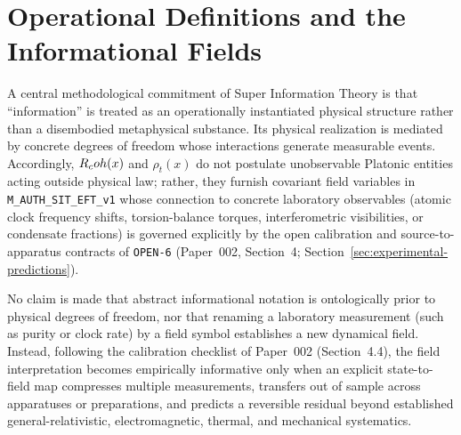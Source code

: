\section{Operational Definitions and the Informational Fields}
\label{sec:operational-definitions}

A central methodological commitment of Super Information Theory is that ``information'' is treated as an operationally instantiated physical structure rather than a disembodied metaphysical substance. Its physical realization is mediated by concrete degrees of freedom whose interactions generate measurable events. Accordingly, $R_coh(x)$ and $\rho_t(x)$ do not postulate unobservable Platonic entities acting outside physical law; rather, they furnish covariant field variables in \texttt{M\_AUTH\_SIT\_EFT\_v1} whose connection to concrete laboratory observables (atomic clock frequency shifts, torsion-balance torques, interferometric visibilities, or condensate fractions) is governed explicitly by the open calibration and source-to-apparatus contracts of \texttt{OPEN-6} (Paper~002, Section~4; Section~\ref{sec:experimental-predictions}).

No claim is made that abstract informational notation is ontologically prior to physical degrees of freedom, nor that renaming a laboratory measurement (such as purity or clock rate) by a field symbol establishes a new dynamical field. Instead, following the calibration checklist of Paper~002 (Section~4.4), the field interpretation becomes empirically informative only when an explicit state-to-field map compresses multiple measurements, transfers out of sample across apparatuses or preparations, and predicts a reversible residual beyond established general-relativistic, electromagnetic, thermal, and mechanical systematics.
